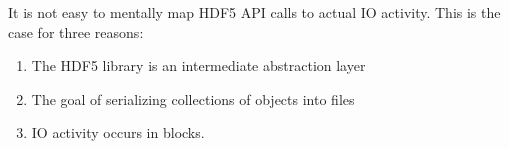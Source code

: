 
It is not easy to mentally map HDF5 API calls to actual IO activity. This is the case for three reasons:
\begin{enumerate}
    \item The HDF5 library is an intermediate abstraction layer
    \item The goal of serializing collections of objects into files
    \item IO activity occurs in blocks.
\end{enumerate}